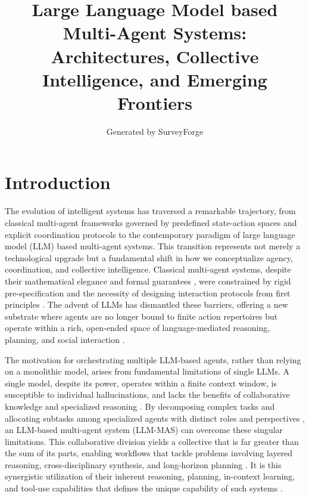 \documentclass[11pt,a4paper]{article}
\title{Large Language Model based Multi-Agent Systems: Architectures, Collective Intelligence, and Emerging Frontiers}
\author{Generated by SurveyForge}
\date{}
\begin{document}
\maketitle
\tableofcontents
\newpage



\section{Introduction}


The evolution of intelligent systems has traversed a remarkable trajectory, from classical multi-agent frameworks governed by predefined state-action spaces and explicit coordination protocols \cite{arxiv:1803.05464v1,arxiv:1501.07423v1,arxiv:1509.08560v1} to the contemporary paradigm of large language model (LLM) based multi-agent systems. This transition represents not merely a technological upgrade but a fundamental shift in how we conceptualize agency, coordination, and collective intelligence. Classical multi-agent systems, despite their mathematical elegance and formal guarantees \cite{arxiv:1307.4477v1,arxiv:1210.5936v1}, were constrained by rigid pre-specification and the necessity of designing interaction protocols from first principles \cite{arxiv:1901.08441v3}. The advent of LLMs has dismantled these barriers, offering a new substrate where agents are no longer bound to finite action repertoires but operate within a rich, open-ended space of language-mediated reasoning, planning, and social interaction \cite{arxiv:2308.11432v5,arxiv:2309.07864v3,arxiv:2401.03428v1}.

The motivation for orchestrating multiple LLM-based agents, rather than relying on a monolithic model, arises from fundamental limitations of single LLMs. A single model, despite its power, operates within a finite context window, is susceptible to individual hallucinations, and lacks the benefits of collaborative knowledge and specialized reasoning \cite{arxiv:2305.19118v1,arxiv:2309.13007v2}. By decomposing complex tasks and allocating subtasks among specialized agents with distinct roles and perspectives \cite{arxiv:2306.03314v1,arxiv:2307.02485v2}, an LLM-based multi-agent system (LLM-MAS) can overcome these singular limitations. This collaborative division yields a collective that is far greater than the sum of its parts, enabling workflows that tackle problems involving layered reasoning, cross-disciplinary synthesis, and long-horizon planning \cite{arxiv:2406.08979v1,arxiv:2403.08282v2}. It is this synergistic utilization of their inherent reasoning, planning, in-context learning, and tool-use capabilities that defines the unique capability of such systems \cite{arxiv:2308.03688v2,arxiv:2402.00798v2}.
\end{document}
